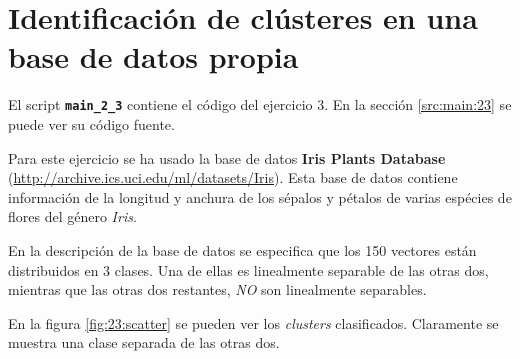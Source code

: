 \documentclass[11pt]{article} %
\begin{document}
\clearpage
\restoregeometry

\section{Identificación de clústeres en una base de datos propia}

El script \textbf{\texttt{main\_2\_3}} contiene el código del ejercicio 3. En
la sección \ref{src:main:23} se puede ver su código fuente.

Para este ejercicio se ha usado la base de datos \textbf{Iris Plants Database}
(\url{http://archive.ics.uci.edu/ml/datasets/Iris}). Esta base de
datos contiene información de la longitud y anchura de los sépalos y pétalos de
varias espécies de flores del género \emph{Iris}.

En la descripción de la base de datos se especifica que los 150 vectores están
distribuidos en 3 clases. Una de ellas es linealmente separable de las otras
dos, mientras que las otras dos restantes, \emph{NO} son linealmente separables.

En la figura \ref{fig:23:scatter} se pueden ver los \emph{clusters}
clasificados. Claramente se muestra una clase separada de las otras dos.
\end{document}
